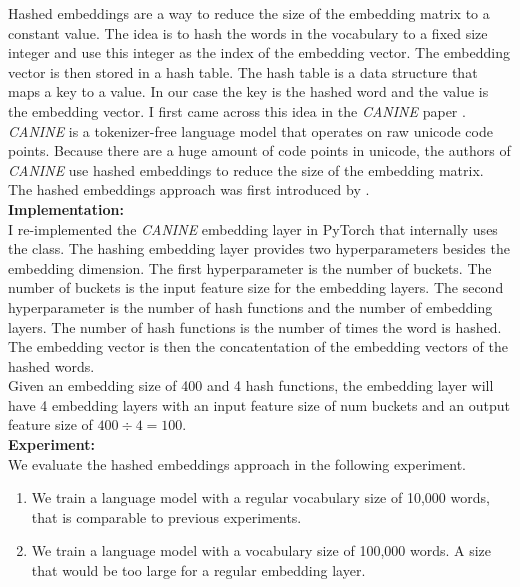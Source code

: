 \documentclass[11pt]{article}
\begin{document}
Hashed embeddings are a way to reduce the size of the embedding matrix to a constant value.
The idea is to hash the words in the vocabulary to a fixed size integer
and use this integer as the index of the embedding vector. The embedding vector is then stored
in a hash table. The hash table is a data structure that maps a key to a value. In our case the
key is the hashed word and the value is the embedding vector.
I first came across this idea in the \textit{CANINE} paper \cite{clarkCANINEPretrainingEfficient2022a}.
\textit{CANINE} is a tokenizer-free language model that operates on raw unicode code points.
Because there are a huge amount of code points in unicode, the authors of \textit{CANINE} use
hashed embeddings to reduce the size of the embedding matrix. The hashed embeddings approach was
first introduced by \cite{svenstrupHashEmbeddingsEfficient2017}.\\

\textbf{Implementation:}\\
I re-implemented the \textit{CANINE} embedding layer in PyTorch that internally uses the 
class. The hashing embedding layer provides two hyperparameters besides the embedding dimension.
The first hyperparameter is the number of buckets. The number of buckets is the input feature size 
for the embedding layers. The second hyperparameter is the number of
hash functions and the number of embedding layers. The number of hash functions is the number of times the word is hashed. The
embedding vector is then the concatentation of the embedding vectors of the hashed words.\\

Given an embedding size of 400 and 4 hash functions, the embedding layer will have 4 embedding layers
with an input feature size of num buckets and an output feature size of $400 \div 4 = 100$.\\

\textbf{Experiment:}\\
We evaluate the hashed embeddings approach in the following experiment. 

\begin{enumerate}
    \item We train a language model with a regular vocabulary size of 10,000 words, that is comparable
    to previous experiments.
    \item We train a language model with a vocabulary size of 100,000 words. A size that would be
    too large for a regular embedding layer.
\end{enumerate}
\end{document}
